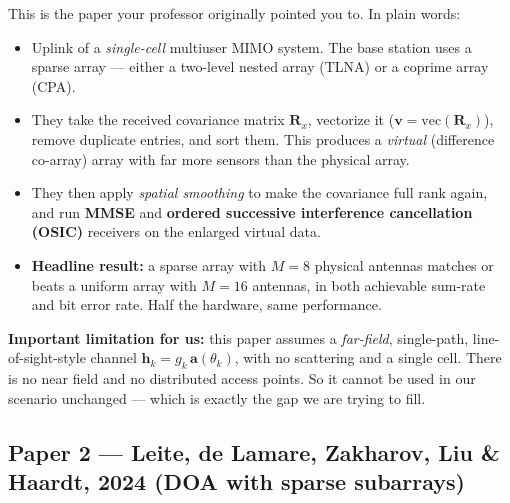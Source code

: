 \documentclass[11pt]{article}
\begin{document}
This is the paper your professor originally pointed you to. In plain words:
\begin{itemize}
\item Uplink of a \emph{single-cell} multiuser MIMO system. The base station uses a sparse array ---
either a two-level nested array (TLNA) or a coprime array (CPA).
\item They take the received covariance matrix $\mathbf{R}_x$, vectorize it
($\mathbf{v}=\mathrm{vec}(\mathbf{R}_x)$), remove duplicate entries, and sort them. This produces a
\emph{virtual} (difference co-array) array with far more sensors than the physical array.
\item They then apply \emph{spatial smoothing} to make the covariance full rank again, and run
\textbf{MMSE} and \textbf{ordered successive interference cancellation (OSIC)} receivers on the
enlarged virtual data.
\item \textbf{Headline result:} a sparse array with $M=8$ physical antennas matches or beats a
uniform array with $M=16$ antennas, in both achievable sum-rate and bit error rate. Half the
hardware, same performance.
\end{itemize}

\begin{warnbox}
\textbf{Important limitation for us:} this paper assumes a \emph{far-field}, single-path,
line-of-sight-style channel $\mathbf{h}_k=g_k\,\mathbf{a}(\theta_k)$, with no scattering and a
single cell. There is no near field and no distributed access points. So it cannot be used in our
scenario unchanged --- which is exactly the gap we are trying to fill.
\end{warnbox}

\subsection{Paper 2 --- Leite, de Lamare, Zakharov, Liu \& Haardt, 2024 (DOA with sparse subarrays)}
\end{document}

